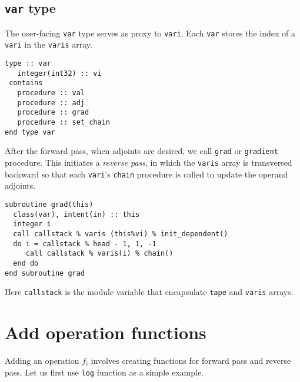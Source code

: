 \documentclass[12pt, reqno, oneside]{amsbook}
\begin{document}
\section{\texttt{var} type}
\label{sec:orgb0c50cd}
The user-facing \texttt{var} type serves as proxy to \texttt{vari}. Each \texttt{var}
stores the index of a \texttt{vari} in the \texttt{varis} array.
\begin{verbatim}
type :: var
   integer(int32) :: vi
 contains
   procedure :: val
   procedure :: adj
   procedure :: grad
   procedure :: set_chain
end type var
\end{verbatim}
After the forward pass, when adjoints are desired, we call \texttt{grad} or
\texttt{gradient} procedure. This initiates a \emph{reverse pass}, in which  the
\texttt{varis} array is transversed backward
so that each \texttt{vari}'s \texttt{chain} procedure is called to update the
operand adjoints.
\begin{verbatim}
subroutine grad(this)
  class(var), intent(in) :: this
  integer i
  call callstack % varis (this%vi) % init_dependent()
  do i = callstack % head - 1, 1, -1
     call callstack % varis(i) % chain()
  end do
end subroutine grad
\end{verbatim}
Here \texttt{callstack} is the module variable that encapsulate \texttt{tape} and
\texttt{varis} arrays.

\chapter{Add operation functions}
\label{sec:org42182fa}
Adding an operation \(f_i\) involves creating functions for forward
pass and reverse pass. Let us first use \texttt{log} function as a simple
example.
\end{document}
